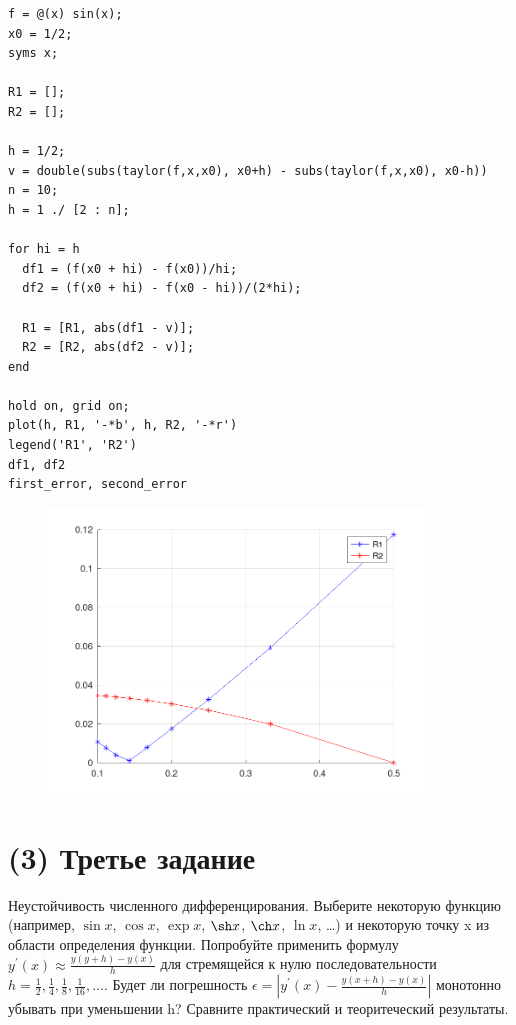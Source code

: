 \begin{lstlisting}
f = @(x) sin(x);
x0 = 1/2;
syms x;

R1 = [];
R2 = [];

h = 1/2;
v = double(subs(taylor(f,x,x0), x0+h) - subs(taylor(f,x,x0), x0-h))
n = 10;
h = 1 ./ [2 : n];

for hi = h
  df1 = (f(x0 + hi) - f(x0))/hi;
  df2 = (f(x0 + hi) - f(x0 - hi))/(2*hi);

  R1 = [R1, abs(df1 - v)];
  R2 = [R2, abs(df2 - v)];
end

hold on, grid on;
plot(h, R1, '-*b', h, R2, '-*r')
legend('R1', 'R2')
df1, df2
first_error, second_error
\end{lstlisting}
\begin{figure}[H]
  \caption{}
  \label{fig:plot_1}
  \centering
  \includegraphics[width=0.9\textwidth]{images/image_2.png}
\end{figure}

\section{(3) Третье задание}
Неустойчивость численного дифференцирования. Выберите некоторую функцию (например, $\sin x$, $\cos x$, $\exp x$, $\sh x$, $\ch x$, $\ln x$, \ldots) и некоторую точку x из области определения функции. Попробуйте применить формулу $y^{'}(x) \approx \frac{y(y+h) - y(x)}{h}$ для стремящейся к нулю последовательности $h = \frac{1}{2}, \frac{1}{4}, \frac{1}{8}, \frac{1}{16}, \ldots$. Будет ли погрешность $\epsilon = \left |y^{'}(x) - \frac{y(x+h) - y(x)}{h} \right |$ монотонно убывать при уменьшении h? Сравните практический и теоритеческий результаты.\\[5mm]
